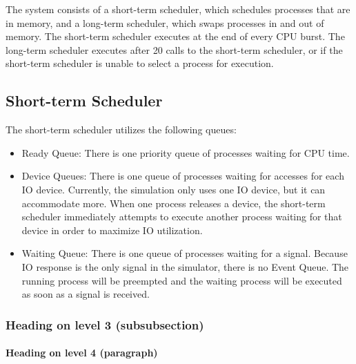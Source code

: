 \documentclass[paper=a4, fontsize=11pt]{scrartcl} %
\numberwithin{equation}{section} %
\numberwithin{figure}{section} %
\numberwithin{table}{section} %
\begin{document}
The system consists of a short-term scheduler, which schedules processes that are in memory, and a long-term scheduler, which swaps processes in and out of memory. The short-term scheduler executes at the end of every CPU burst. The long-term scheduler executes after 20 calls to the short-term scheduler, or if the short-term scheduler is unable to select a process for execution.

\subsection{Short-term Scheduler}

The short-term scheduler utilizes the following queues:
\begin{itemize}
	\item Ready Queue: There is one priority queue of processes waiting for CPU time.
           \item Device Queues: There is one queue of processes waiting for accesses for each IO device. 
Currently, the simulation only uses one IO device, but it can accommodate more. When one process releases
a device, the short-term scheduler immediately attempts to execute another process waiting for that device in order to
maximize IO utilization.
	\item Waiting Queue: There is one queue of processes waiting for a signal. Because IO response is the only signal in the
simulator, there is no Event Queue. The running process will be preempted and the waiting process will be executed as soon as a signal is received.

\end{itemize}





\subsubsection{Heading on level 3 (subsubsection)}

\lipsum[3] %

\paragraph{Heading on level 4 (paragraph)}

\lipsum[6] %

\end{document}
